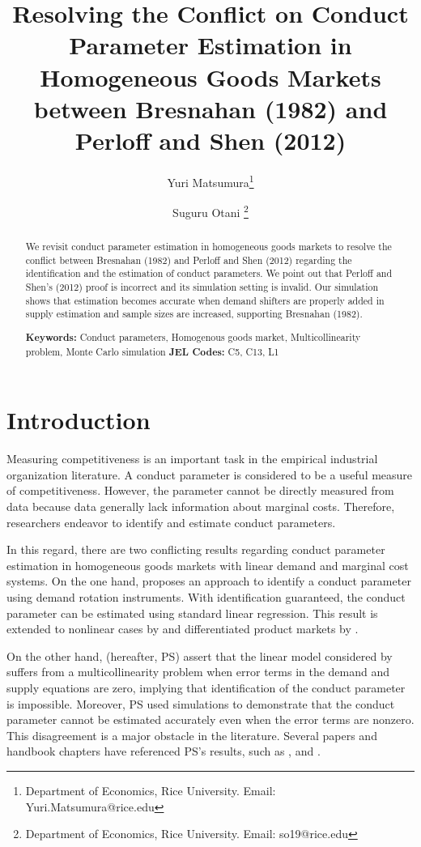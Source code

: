 \documentclass[11pt, a4paper]{article}
\title{Resolving the Conflict on Conduct Parameter Estimation in Homogeneous Goods Markets between Bresnahan (1982) and Perloff and Shen (2012)}
\author{Yuri Matsumura\thanks{Department of Economics, Rice University. Email: Yuri.Matsumura@rice.edu} \and Suguru Otani \thanks{Department of Economics, Rice University. Email: so19@rice.edu
}}
\begin{document}
\maketitle
\begin{abstract}
    We revisit conduct parameter estimation in homogeneous goods markets to resolve the conflict between Bresnahan (1982) and Perloff and Shen (2012) regarding the identification and the estimation of conduct parameters. We point out that Perloff and Shen's (2012) proof is incorrect and its simulation setting is invalid. Our simulation shows that estimation becomes accurate when demand shifters are properly added in supply estimation and sample sizes are increased, supporting Bresnahan (1982).
\vspace{0.1in}

\noindent\textbf{Keywords:} Conduct parameters, Homogenous goods market, Multicollinearity problem, Monte Carlo simulation
\vspace{0in}
\newline
\noindent\textbf{JEL Codes:} C5, C13, L1

\bigskip
\end{abstract}


\section{Introduction}
Measuring competitiveness is an important task in the empirical industrial organization literature.
A conduct parameter is considered to be a useful measure of competitiveness. 
However, the parameter cannot be directly measured from data because data generally lack information about marginal costs.
Therefore, researchers endeavor to identify and estimate conduct parameters.

In this regard, there are two conflicting results regarding conduct parameter estimation in homogeneous goods markets with linear demand and marginal cost systems.
On the one hand, \citet{bresnahan1982oligopoly} proposes an approach to identify a conduct parameter using demand rotation instruments.
With identification guaranteed, the conduct parameter can be estimated using standard linear regression.
This result is extended to nonlinear cases by \citet{lau1982identifying} and differentiated product markets by \citet{nevoIdentificationOligopolySolution1998}.


On the other hand, \citet{perloff2012collinearity} (hereafter, PS) assert that the linear model considered by \citet{bresnahan1982oligopoly} suffers from a multicollinearity problem when error terms in the demand and supply equations are zero, implying that identification of the conduct parameter is impossible.
Moreover, PS used simulations to demonstrate that the conduct parameter cannot be estimated accurately even when the error terms are nonzero. 
This disagreement is a major obstacle in the literature. 
Several papers and handbook chapters have referenced PS’s results, such as \citet{claessensWhatDrivesBank2004, coccoreseMultimarketContactCompetition2013, coccoreseWhatAffectsBank2021, garciaMarketStructuresProduction2020, kumbhakarNewMethodEstimating2012, perekhozhukRegionalLevelAnalysisOligopsony2015}, and \citet{shafferMarketPowerCompetition2017}.
\end{document}
